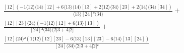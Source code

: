 \documentclass[varwidth, border=5pt]{standalone}
\begin{document}
\begin{my}
$\begin{gathered}
\scriptscriptstyle\frac{[12](-1⟨12⟩⟨14⟩[12]+6⟨13⟩⟨14⟩[13]+2⟨12⟩⟨34⟩[23]+2⟨14⟩⟨34⟩[34])}{⟨13⟩[24]²⟨34⟩} +\\
\scriptscriptstyle\frac{[12][23]⟨24⟩(-1⟨12⟩[12]+6⟨13⟩[13])}{[24]²⟨34⟩⟨2|3+4|2]} +\\
\scriptscriptstyle\frac{[12]⟨24⟩²(1⟨12⟩[12][23]-6⟨13⟩[13][23]-6⟨14⟩[13][24])}{[24]⟨34⟩⟨2|3+4|2]²} \phantom{+}
\end{gathered}$
\end{my}
\end{document}
